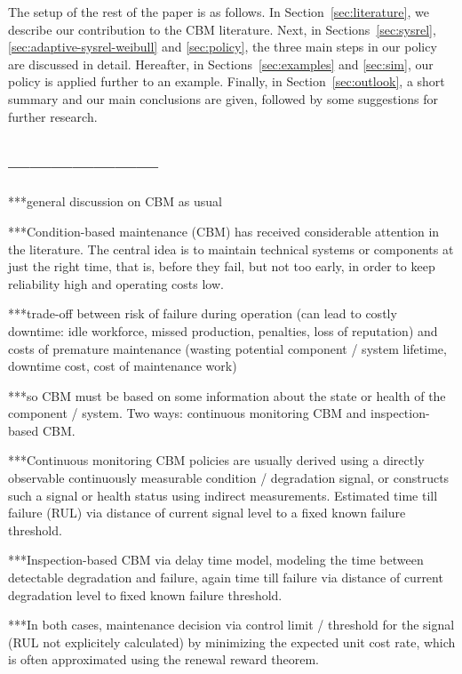\documentclass[authoryear]{elsarticle}
\begin{document}
The setup of the rest of the paper is as follows.
In Section~\ref{sec:literature}, we describe our contribution to the CBM literature.
Next, in Sections~\ref{sec:sysrel}, \ref{sec:adaptive-sysrel-weibull} and \ref{sec:policy},
the three main steps in our policy are discussed in detail.
Hereafter, in Sections~\ref{sec:examples} and \ref{sec:sim},
our policy is applied further to an example.
Finally, in Section~\ref{sec:outlook},
a short summary and our main conclusions are given,
followed by some suggestions for further research.

\iffalse
\subsection*{---------------------}
***general discussion on CBM as usual

***Condition-based maintenance (CBM) has received considerable attention in the literature.
The central idea is to maintain technical systems or components at just the right time,
that is, before they fail,
but not too early, in order to keep reliability high and operating costs low.

***trade-off between risk of failure during operation
(can lead to costly downtime: idle workforce, missed production, penalties, loss of reputation)
and costs of premature maintenance
(wasting potential component / system lifetime, downtime cost, cost of maintenance work)

***so CBM must be based on some information about the state or health of the component / system.
Two ways: continuous monitoring CBM and inspection-based CBM.

***Continuous monitoring CBM policies are usually derived
using a directly observable continuously measurable condition / degradation signal,
or constructs such a signal or health status using indirect measurements.
Estimated time till failure (RUL) \citep{2014:rul-review, 2011:rul-review-statistical}
via distance of current signal level to a fixed known failure threshold.

***Inspection-based CBM via delay time model, modeling the time between detectable degradation and failure,
again time till failure via distance of current degradation level to fixed known failure threshold.

***In both cases, maintenance decision via control limit / threshold for the signal
(RUL not explicitely calculated)
by minimizing the expected unit cost rate,
which is often approximated using the renewal reward theorem.
\end{document}
